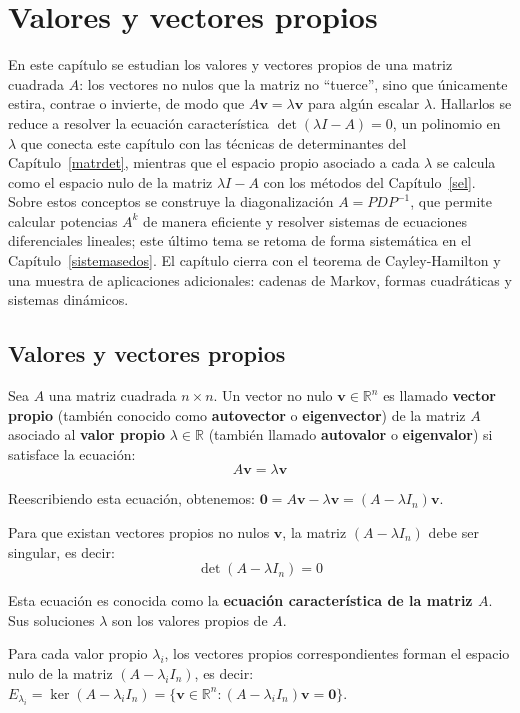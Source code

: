 \chapter{Valores y vectores propios}\label{vvpropios}
En este capítulo se estudian los valores y vectores propios de una matriz cuadrada $A$: los vectores no nulos que la matriz no ``tuerce'', sino que únicamente estira, contrae o invierte, de modo que $A\mathbf{v}=\lambda\mathbf{v}$ para algún escalar $\lambda$. Hallarlos se reduce a resolver la ecuación característica $\det(\lambda I-A)=0$, un polinomio en $\lambda$ que conecta este capítulo con las técnicas de determinantes del Capítulo~\ref{matrdet}, mientras que el espacio propio asociado a cada $\lambda$ se calcula como el espacio nulo de la matriz $\lambda I-A$ con los métodos del Capítulo~\ref{sel}. Sobre estos conceptos se construye la diagonalización $A=PDP^{-1}$, que permite calcular potencias $A^{k}$ de manera eficiente y resolver sistemas de ecuaciones diferenciales lineales; este último tema se retoma de forma sistemática en el Capítulo~\ref{sistemasedos}. El capítulo cierra con el teorema de Cayley-Hamilton y una muestra de aplicaciones adicionales: cadenas de Markov, formas cuadráticas y sistemas dinámicos.

\section{Valores y vectores propios}

\begin{definition}
	Sea $A$ una matriz cuadrada $n\times n$. Un vector no nulo $\mathbf{v}\in \mathbb{R}^n$ es llamado \textbf{vector propio} (también conocido como \textbf{autovector} o \textbf{eigenvector}) de la matriz $A$ asociado al \textbf{valor propio} $\lambda \in \mathbb{R}$ (también llamado \textbf{autovalor} o \textbf{eigenvalor}) si satisface la ecuación:
	$$\boxed{A\mathbf{v} = \lambda \mathbf{v}}$$
	
	Reescribiendo esta ecuación, obtenemos: $\mathbf{0} = A\mathbf{v} - \lambda \mathbf{v} = (A - \lambda I_n)\mathbf{v}.$
	
	Para que existan vectores propios no nulos $\mathbf{v}$, la matriz $(A - \lambda I_n)$ debe ser singular, es decir:
	$$\det(A - \lambda I_n) = 0$$
	
	Esta ecuación es conocida como la \textbf{ecuación característica de la matriz $A$}. Sus soluciones $\lambda$ son los valores propios de $A$.
	
	Para cada valor propio $\lambda_i$, los vectores propios correspondientes forman el espacio nulo de la matriz $(A - \lambda_i I_n)$, es decir: $E_{\lambda_i} = \ker(A - \lambda_i I_n) = \{\mathbf{v} \in \mathbb{R}^n : (A - \lambda_i I_n)\mathbf{v} = \mathbf{0}\}.$
\end{definition}

